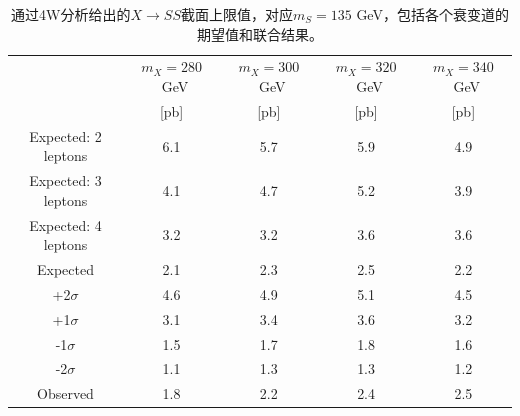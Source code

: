 \begin{table}
\scriptsize
  \centering
  \begin{tabular}{ccccc}
    \hline
    & $m_X = 280$~GeV & $m_X = 300$~GeV & $m_X = 320$~GeV & $m_X = 340$~GeV \\
         & [pb] &  [pb] &  [pb] &  [pb]  \\
    \hline
    \hline
    Expected: 2 leptons & 6.1 & 5.7 & 5.9 & 4.9 \\
    \hline
    Expected: 3 leptons & 4.1 & 4.7 & 5.2 & 3.9 \\
    \hline
    Expected: 4 leptons & 3.2 & 3.2 & 3.6 & 3.6 \\
    \hline
    \hline
    Expected & 2.1 & 2.3 & 2.5 & 2.2 \\
    \hline
    +2$\sigma$ & 4.6 & 4.9 & 5.1 & 4.5 \\
    \hline
    +1$\sigma$ & 3.1 & 3.4 & 3.6 & 3.2 \\
    \hline
    -1$\sigma$ & 1.5 & 1.7 & 1.8 & 1.6 \\
    \hline
    -2$\sigma$ & 1.1 & 1.3 & 1.3 & 1.2 \\
    \hline
    \hline
    Observed & 1.8 & 2.2 & 2.4 & 2.5 \\
    \hline
  \end{tabular}
 \caption{通过4W分析给出的$X\rightarrow SS$截面上限值，对应$m_S=135$ GeV，包括各个衰变道的期望值和联合结果。}
  \label{tab:limit-comb-SS-mS}
\end{table}
